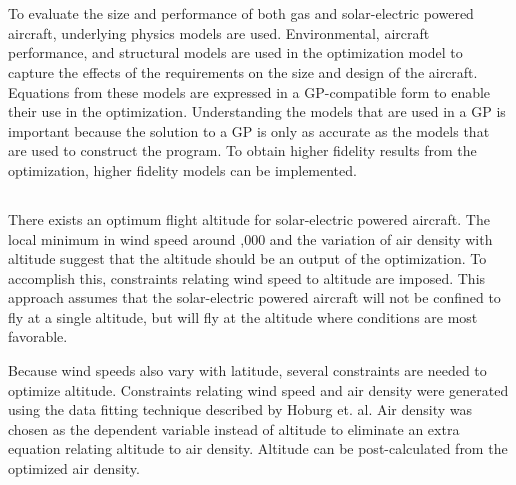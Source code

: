 \section{}

\DIFaddend To evaluate the size and performance of both gas and solar-electric powered aircraft, underlying physics models are used.  
Environmental, aircraft performance, and structural models are used in the optimization model to capture the effects of the requirements on the size and design of the aircraft.
Equations from these models are expressed in a GP-compatible form to enable their use in the optimization. 
Understanding the models that are used in a GP is important because the solution to a GP is only as accurate as the models that are used to construct the program.  
To obtain higher fidelity results from the optimization, higher fidelity models can be implemented. 

\subsection{\DIFdelbegin {}\DIFdelend \DIFaddbegin {}\DIFaddend }

\DIFaddbegin \subsubsection{}

\DIFaddend There exists an optimum flight altitude for solar-electric powered aircraft.  
The local minimum in wind speed around \DIFdelbegin {}\DIFdelend \DIFaddbegin {}\DIFaddend ,000 \DIFdelbegin {}\DIFdelend \DIFaddbegin {}\DIFaddend and the variation of air density with altitude suggest that the altitude should be an output of the optimization. 
To accomplish this, constraints relating wind speed to altitude are imposed. 
This approach assumes that the solar-electric powered aircraft will not be confined to fly at a single altitude, but will fly at the altitude where conditions are most favorable.

Because wind speeds also vary with latitude, several constraints are needed to optimize altitude. 
Constraints relating wind speed and air density were generated using the data fitting technique described by Hoburg et. al\cite{fitting}.
Air density was chosen as the dependent variable instead of altitude to eliminate an extra equation relating altitude to air density. 
Altitude can be post-calculated from the optimized air density. 

